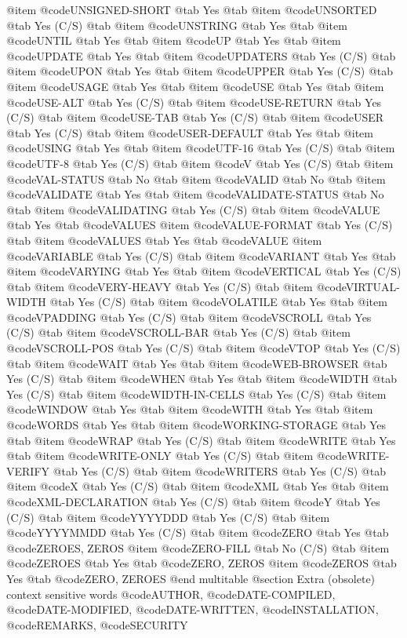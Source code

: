 @item @code{UNSIGNED-SHORT} @tab Yes @tab 
@item @code{UNSORTED} @tab Yes	(C/S) @tab 
@item @code{UNSTRING} @tab Yes @tab 
@item @code{UNTIL} @tab Yes @tab 
@item @code{UP} @tab Yes @tab 
@item @code{UPDATE} @tab Yes @tab 
@item @code{UPDATERS} @tab Yes	(C/S) @tab 
@item @code{UPON} @tab Yes @tab 
@item @code{UPPER} @tab Yes	(C/S) @tab 
@item @code{USAGE} @tab Yes @tab 
@item @code{USE} @tab Yes @tab 
@item @code{USE-ALT} @tab Yes	(C/S) @tab 
@item @code{USE-RETURN} @tab Yes	(C/S) @tab 
@item @code{USE-TAB} @tab Yes	(C/S) @tab 
@item @code{USER} @tab Yes	(C/S) @tab 
@item @code{USER-DEFAULT} @tab Yes @tab 
@item @code{USING} @tab Yes @tab 
@item @code{UTF-16} @tab Yes	(C/S) @tab 
@item @code{UTF-8} @tab Yes	(C/S) @tab 
@item @code{V} @tab Yes	(C/S) @tab 
@item @code{VAL-STATUS} @tab No @tab 
@item @code{VALID} @tab No @tab 
@item @code{VALIDATE} @tab Yes @tab 
@item @code{VALIDATE-STATUS} @tab No @tab 
@item @code{VALIDATING} @tab Yes	(C/S) @tab 
@item @code{VALUE} @tab Yes @tab @code{VALUES}
@item @code{VALUE-FORMAT} @tab Yes	(C/S) @tab 
@item @code{VALUES} @tab Yes @tab @code{VALUE}
@item @code{VARIABLE} @tab Yes	(C/S) @tab 
@item @code{VARIANT} @tab Yes @tab 
@item @code{VARYING} @tab Yes @tab 
@item @code{VERTICAL} @tab Yes	(C/S) @tab 
@item @code{VERY-HEAVY} @tab Yes	(C/S) @tab 
@item @code{VIRTUAL-WIDTH} @tab Yes	(C/S) @tab 
@item @code{VOLATILE} @tab Yes @tab 
@item @code{VPADDING} @tab Yes	(C/S) @tab 
@item @code{VSCROLL} @tab Yes	(C/S) @tab 
@item @code{VSCROLL-BAR} @tab Yes	(C/S) @tab 
@item @code{VSCROLL-POS} @tab Yes	(C/S) @tab 
@item @code{VTOP} @tab Yes	(C/S) @tab 
@item @code{WAIT} @tab Yes @tab 
@item @code{WEB-BROWSER} @tab Yes	(C/S) @tab 
@item @code{WHEN} @tab Yes @tab 
@item @code{WIDTH} @tab Yes	(C/S) @tab 
@item @code{WIDTH-IN-CELLS} @tab Yes	(C/S) @tab 
@item @code{WINDOW} @tab Yes @tab 
@item @code{WITH} @tab Yes @tab 
@item @code{WORDS} @tab Yes @tab 
@item @code{WORKING-STORAGE} @tab Yes @tab 
@item @code{WRAP} @tab Yes	(C/S) @tab 
@item @code{WRITE} @tab Yes @tab 
@item @code{WRITE-ONLY} @tab Yes	(C/S) @tab 
@item @code{WRITE-VERIFY} @tab Yes	(C/S) @tab 
@item @code{WRITERS} @tab Yes	(C/S) @tab 
@item @code{X} @tab Yes	(C/S) @tab 
@item @code{XML} @tab Yes @tab 
@item @code{XML-DECLARATION} @tab Yes	(C/S) @tab 
@item @code{Y} @tab Yes	(C/S) @tab 
@item @code{YYYYDDD} @tab Yes	(C/S) @tab 
@item @code{YYYYMMDD} @tab Yes	(C/S) @tab 
@item @code{ZERO} @tab Yes @tab @code{ZEROES, ZEROS}
@item @code{ZERO-FILL} @tab No	(C/S) @tab 
@item @code{ZEROES} @tab Yes @tab @code{ZERO, ZEROS}
@item @code{ZEROS} @tab Yes @tab @code{ZERO, ZEROES}
@end multitable
@section Extra (obsolete) context sensitive words
@code{AUTHOR}, @code{DATE-COMPILED}, @code{DATE-MODIFIED}, @code{DATE-WRITTEN}, @code{INSTALLATION}, @code{REMARKS}, @code{SECURITY}

